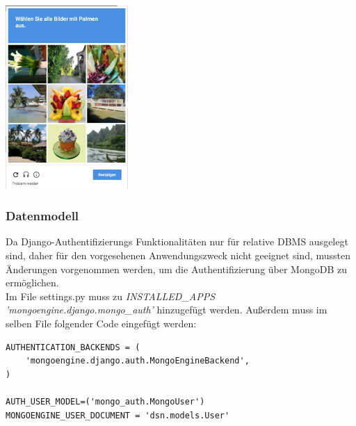 \includegraphics[width=0.35\textwidth]{images/usermanagement/Captcha}\\

\subsubsection{Datenmodell}
Da Django-Authentifizierungs Funktionalitäten nur für relative DBMS ausgelegt sind, daher für den vorgesehenen Anwendungszweck nicht geeignet sind, mussten Änderungen vorgenommen werden, um die Authentifizierung über MongoDB zu ermöglichen.\\

Im File settings.py muss zu \textit{INSTALLED\_APPS} 
\textit{'mongoengine.django.mongo\_auth'} hinzugefügt werden.
Außerdem muss im selben File folgender Code eingefügt werden:
\begin{lstlisting}
AUTHENTICATION_BACKENDS = (
    'mongoengine.django.auth.MongoEngineBackend',
)

AUTH_USER_MODEL=('mongo_auth.MongoUser')
MONGOENGINE_USER_DOCUMENT = 'dsn.models.User'
\end{lstlisting}

